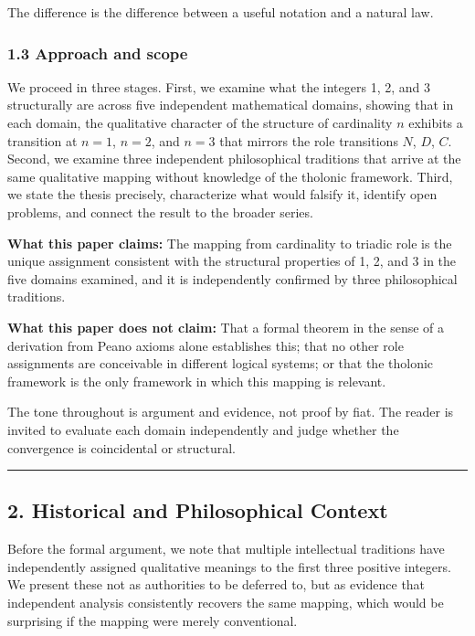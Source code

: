 \documentclass[
  11pt,
  letterpaper,
]{article}
\begin{document}
The difference is the difference between a useful notation and a natural
law.

\subsubsection{1.3 Approach and scope}\label{approach-and-scope}

We proceed in three stages. First, we examine what the integers 1, 2,
and 3 structurally are across five independent mathematical domains,
showing that in each domain, the qualitative character of the structure
of cardinality \(n\) exhibits a transition at \(n = 1\), \(n = 2\), and
\(n = 3\) that mirrors the role transitions \(N\), \(D\), \(C\). Second,
we examine three independent philosophical traditions that arrive at the
same qualitative mapping without knowledge of the tholonic framework.
Third, we state the thesis precisely, characterize what would falsify
it, identify open problems, and connect the result to the broader
series.

\textbf{What this paper claims:} The mapping from cardinality to triadic
role is the unique assignment consistent with the structural properties
of 1, 2, and 3 in the five domains examined, and it is independently
confirmed by three philosophical traditions.

\textbf{What this paper does not claim:} That a formal theorem in the
sense of a derivation from Peano axioms alone establishes this; that no
other role assignments are conceivable in different logical systems; or
that the tholonic framework is the only framework in which this mapping
is relevant.

The tone throughout is argument and evidence, not proof by fiat. The
reader is invited to evaluate each domain independently and judge
whether the convergence is coincidental or structural.

\begin{center}\rule{0.5\linewidth}{0.5pt}\end{center}

\subsection{2. Historical and Philosophical
Context}\label{historical-and-philosophical-context}

Before the formal argument, we note that multiple intellectual
traditions have independently assigned qualitative meanings to the first
three positive integers. We present these not as authorities to be
deferred to, but as evidence that independent analysis consistently
recovers the same mapping, which would be surprising if the mapping were
merely conventional.
\end{document}
